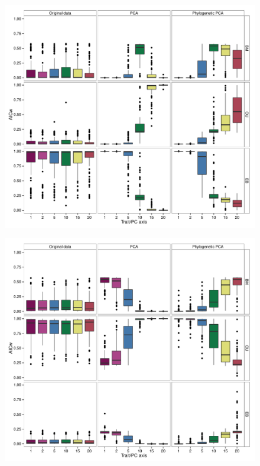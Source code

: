 \documentclass[a4paper,12pt]{article}
\begin{document}
\begin{figure}[p]
\centering
\includegraphics[scale=0.5]{./fig/box-aicw-mveb.pdf}
\caption{}
\label{aicweb}
\end{figure}

\begin{figure}[p]
\centering
\includegraphics[scale=0.5]{./fig/box-aicw-mvou.pdf}
\caption{}
\label{aicwou}
\end{figure}


\newpage



\end{document}
